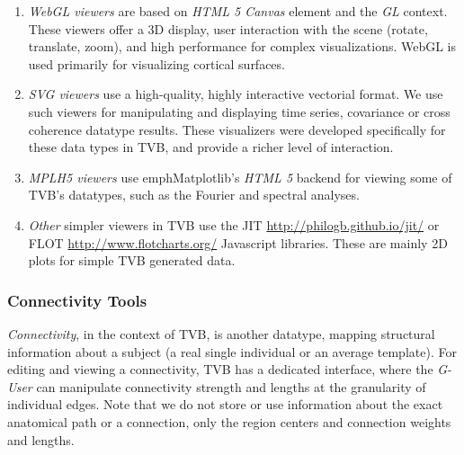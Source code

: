 	\begin{enumerate}
		\item \emph{WebGL viewers} are based on \emph{HTML 5 Canvas} element
		and the \emph{GL} context. These viewers offer a 3D display,
		 user interaction with the scene (rotate,
		translate, zoom), and high performance for complex visualizations.
        WebGL is used primarily for visualizing cortical surfaces.
		
		\item \emph{SVG viewers} use a high-quality, highly interactive vectorial 
            format. We
		use such viewers for manipulating and displaying time series,
		covariance or cross coherence datatype results. These visualizers
		were developed specifically for these data types in TVB, and provide a 
		richer level of interaction.

		\item \emph{MPLH5 viewers} use  emph{Matplotlib}'s \emph{HTML 5}
		backend for viewing some of TVB's datatypes, such as
		the Fourier and spectral analyses. 

		\item \emph{Other} simpler viewers in TVB use the JIT
		\url{http://philogb.github.io/jit/} or FLOT
		\url{http://www.flotcharts.org/} Javascript libraries. These are mainly
		2D plots for simple TVB generated data.
	\end{enumerate}

\subsubsection{Connectivity Tools}

		\emph{Connectivity}, in the context of TVB, is another datatype, mapping structural
		information about a subject (a real single individual or an average template). For
		editing and viewing a connectivity, TVB has a dedicated interface, where
		the \emph{G-User} can manipulate connectivity strength and lengths
		at the granularity of individual edges.
        Note that we do not store or use information about the exact anatomical path or
		a connection, only the region centers and connection weights and
		lengths.

